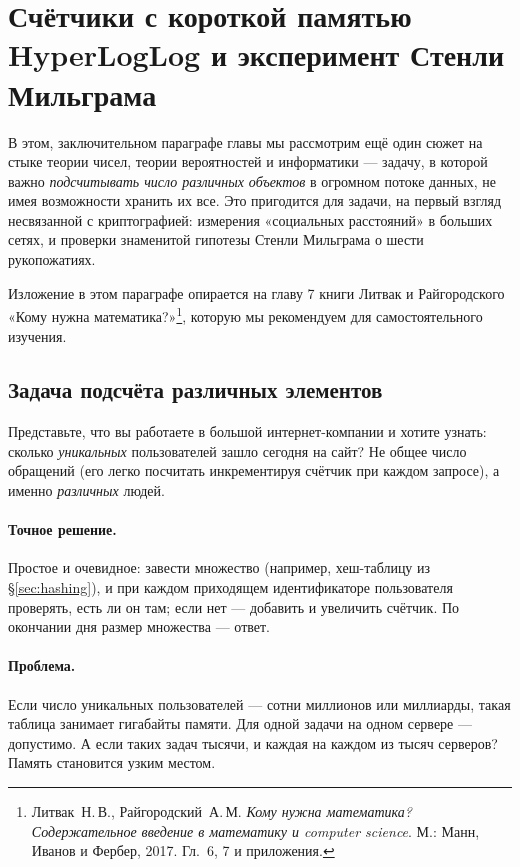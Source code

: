 \section{Счётчики с короткой памятью HyperLogLog и эксперимент Стенли Мильграма}
\label{sec:hll}

В этом, заключительном параграфе главы мы рассмотрим ещё один сюжет на стыке теории чисел, теории вероятностей и информатики --- задачу, в которой важно \emph{подсчитывать число различных объектов} в огромном потоке данных, не имея возможности хранить их все. Это пригодится для задачи, на первый взгляд несвязанной с криптографией: измерения «социальных расстояний» в больших сетях, и проверки знаменитой гипотезы Стенли Мильграма о шести рукопожатиях.

Изложение в этом параграфе опирается на главу 7 книги Литвак и Райгородского «Кому нужна математика?»\footnote{Литвак~Н.\,В., Райгородский~А.\,М. \emph{Кому нужна математика? Содержательное введение в математику и computer science}. М.: Манн, Иванов и Фербер, 2017. Гл.~6, 7 и приложения.}, которую мы рекомендуем для самостоятельного изучения.

\subsection{Задача подсчёта различных элементов}

Представьте, что вы работаете в большой интернет-компании и хотите узнать: сколько \emph{уникальных} пользователей зашло сегодня на сайт? Не общее число обращений (его легко посчитать инкрементируя счётчик при каждом запросе), а именно \emph{различных} людей.

\paragraph*{Точное решение.} Простое и очевидное: завести множество (например, хеш-таблицу из §\ref{sec:hashing}), и при каждом приходящем идентификаторе пользователя проверять, есть ли он там; если нет --- добавить и увеличить счётчик. По окончании дня размер множества --- ответ.

\paragraph*{Проблема.} Если число уникальных пользователей --- сотни миллионов или миллиарды, такая таблица занимает гигабайты памяти. Для одной задачи на одном сервере --- допустимо. А если таких задач тысячи, и каждая на каждом из тысяч серверов? Память становится узким местом.

